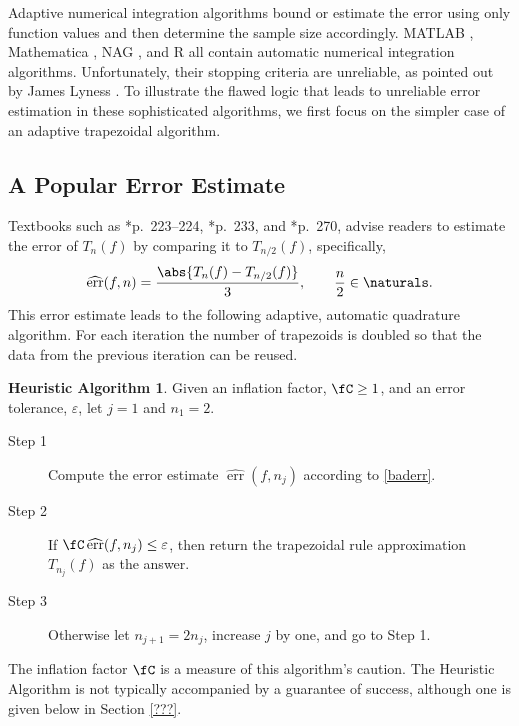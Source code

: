 \documentclass[]{article}
\DeclareMathOperator{\err}{err}
\newcommand{\herr}{\widehat{\err}}
\theoremstyle{definition}
\newtheorem*{guessalgo}{Heuristic Algorithm}
\theoremstyle{remark}
\begin{document}
Adaptive numerical integration algorithms bound or estimate the error using only function values and then determine the sample size accordingly.  MATLAB \cite{MAT8.3}, Mathematica \cite{Mat9a}, NAG \cite{NAG23}, and R \cite{R2512} all contain automatic numerical integration algorithms.  Unfortunately, their stopping criteria are unreliable, as pointed out by James Lyness .  To illustrate the flawed logic that leads to unreliable error estimation in these sophisticated algorithms, we first focus on the simpler case of an adaptive trapezoidal algorithm.

\subsection{A Popular Error Estimate}
Textbooks such as *{p.\ 223--224}, *{p.\ 233}, and  *{p.\ 270}, advise readers to estimate the error of $T_n(f)$ by comparing it to $T_{n/2}(f)$, specifically,
\begin{equation}\label{baderr}
\herr(f,n) = \frac{\abs{T_n(f) - T_{n/2}(f)}}{3}, \qquad \frac n2 \in \naturals.
\end{equation}
This error estimate leads to the following adaptive, automatic  quadrature algorithm. For each iteration the number of trapezoids is doubled so that the data from the previous iteration can be reused. 

\begin{guessalgo} Given an inflation factor, $\fC\ge 1$, and an error tolerance, $\varepsilon$, let $j=1$ and $n_1=2$.

\begin{description} 

\item[Step 1] Compute the error estimate $\herr(f,n_j)$ according to \eqref{baderr}.

\item [Step 2] If $\fC\,\herr(f,n_j) \le \varepsilon$, then return the trapezoidal rule approximation $T_{n_j}(f)$ as the answer.  

\item [Step 3] Otherwise let $n_{j+1}=2 n_j$, increase $j$ by one, and go to Step 1.

\end{description}

\end{guessalgo}

The inflation factor $\fC$ is a measure of this algorithm's caution.  The Heuristic Algorithm is not typically accompanied by a guarantee of success, although one is given below in Section \ref{???}.
\end{document}

